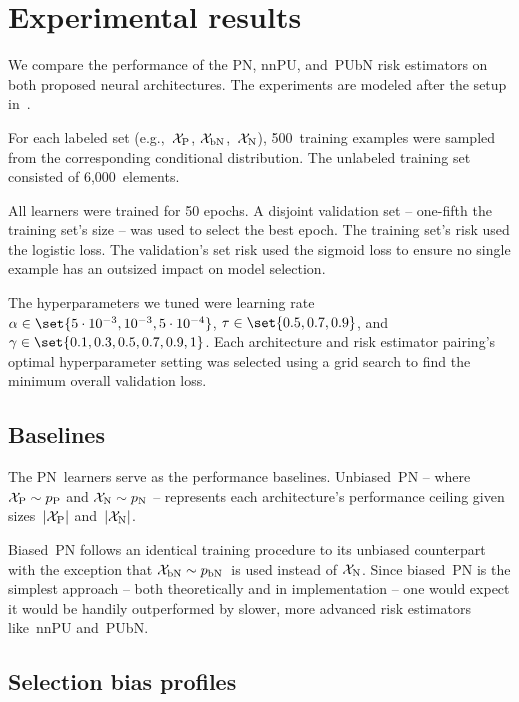\section{Experimental results}\label{sec:ExperimentalResults}

We compare the performance of the PN, nnPU, and~PUbN risk estimators on both proposed neural architectures.  The experiments are modeled after the setup in~\cite{Hsieh:2018}.

For each labeled set (e.g.,~$\mathcal{X}_{\textnormal{P}}$, $\mathcal{X}_{\textnormal{bN}}$,~$\mathcal{X}_{\textnormal{N}}$), 500~training examples were sampled from the corresponding conditional distribution.  The unlabeled training set consisted of 6,000~elements.

All learners were trained for 50 epochs. A disjoint validation set -- one-fifth the training set's size -- was used to select the best epoch. The training set's risk used the logistic loss.  The validation's set risk used the sigmoid loss to ensure no single example has an outsized impact on model selection.

The hyperparameters we tuned were learning rate ${\alpha \in \set{5 \cdot 10^{-3}, 10^{-3}, 5 \cdot 10^{-4}}}$, ${\tau \in \set{0.5, 0.7, 0.9}}$, and ${\gamma \in \set{0.1, 0.3, 0.5, 0.7, 0.9, 1}}$.  Each architecture and risk estimator pairing's optimal hyperparameter setting was selected using a grid search to find the minimum overall validation loss.

\subsection{Baselines}

The PN~learners serve as the performance baselines.  Unbiased~PN -- where ${\mathcal{X}_{\textnormal{P}} \sim p_{\textnormal{P}}}$ and ${\mathcal{X}_{\textnormal{N}} \sim p_{\textnormal{N}}}$ -- represents each architecture's performance ceiling given sizes~$\lvert\mathcal{X}_{\textnormal{P}}\rvert$ and~$\lvert\mathcal{X}_{\textnormal{N}}\rvert$.

Biased~PN follows an identical training procedure to its unbiased counterpart with the exception that ${\mathcal{X}_{\textnormal{bN}} \sim p_{\textnormal{bN}}}$~is used instead of $\mathcal{X}_{\textnormal{N}}$.  Since biased~PN is the simplest approach -- both theoretically and in implementation -- one would expect it would be handily outperformed by slower, more advanced risk estimators like~nnPU and~PUbN.

\subsection{Selection bias profiles}

